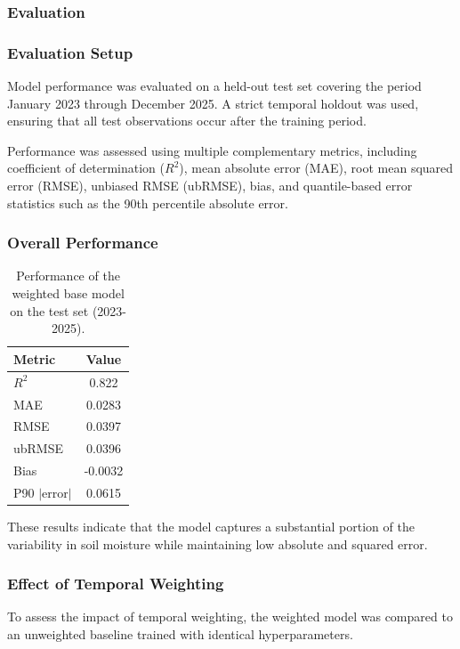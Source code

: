 \subsubsection*{Evaluation}
\label{sec:temporal_eval}

\subsubsection*{Evaluation Setup}
Model performance was evaluated on a held-out test set covering the period January 2023 through December 2025. A strict temporal holdout was used, ensuring that all test observations occur after the training period.

Performance was assessed using multiple complementary metrics, including coefficient of determination ($R^2$), mean absolute error (MAE), root mean squared error (RMSE), unbiased RMSE (ubRMSE), bias, and quantile-based error statistics such as the 90th percentile absolute error.

\subsubsection*{Overall Performance}

\begin{table}[H]
\centering
\begin{tabular}{lc}
\toprule
\textbf{Metric} & \textbf{Value} \\
\midrule
$R^2$ & 0.822 \\
MAE & 0.0283 \\
RMSE & 0.0397 \\
ubRMSE & 0.0396 \\
Bias & -0.0032 \\
P90 $|$error$|$ & 0.0615 \\
\bottomrule
\end{tabular}
\caption{Performance of the weighted base model on the test set (2023-2025).}
\end{table}

These results indicate that the model captures a substantial portion of the variability in soil moisture while maintaining low absolute and squared error.

\subsubsection*{Effect of Temporal Weighting}
To assess the impact of temporal weighting, the weighted model was compared to an unweighted baseline trained with identical hyperparameters.

